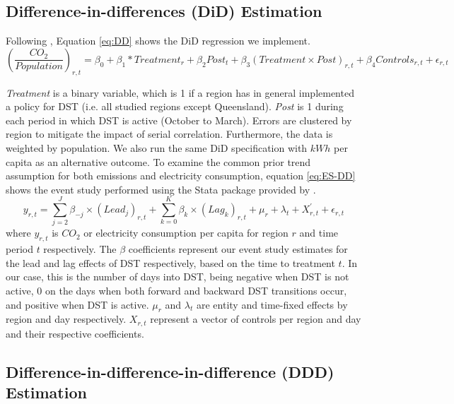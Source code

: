 \subsection{Difference-in-differences (DiD) Estimation}
Following \textcites{callaway_difference--differences_2021, goodman-bacon_difference--differences_2021}, Equation \ref{eq:DD} shows the \ac{DiD} regression we implement.
\begin{equation}
    \left(\frac{CO_2}{Population}\right)_{r,t}
 = \beta_0 + \beta_1*Treatment_{r} + \beta_2Post_{t} + \beta_3(Treatment \times Post)_{r,t} + \beta_4 Controls_{r,t}
     + \epsilon_{r,t}
     \label{eq:DD}
\end{equation}

\textit{Treatment} is a binary variable, which is 1 if a region has in general implemented a policy for \ac{DST} (i.e. all studied regions except Queensland). \textit{Post} is 1 during each period in which \ac{DST} is active (October to March). Errors are clustered by region to mitigate the impact of serial correlation. Furthermore, the data is weighted by population. We also run the same \ac{DiD} specification with $kWh$ per capita as an alternative outcome.
To examine the common prior trend assumption for both emissions and electricity consumption, equation \ref{eq:ES-DD} shows the event study performed using the Stata package provided by \textcite{clarke_implementing_2021}.
\begin{equation}
    y_{r,t} = \sum_{j=2}^{J} \beta_{-j} \times (Lead_j)_{r,t} + \sum_{k=0}^K \beta_{k} \times (Lag_k)_{r,t} + \mu_r + \lambda_t + X^{'}_{r,t} + \epsilon_{r,t}
    \label{eq:ES-DD}
\end{equation}
where $y_{r,t}$ is $CO_2$ or electricity consumption per capita for region $r$ and time period $t$ respectively. The $\beta$ coefficients represent our event study estimates for the lead and lag effects of DST respectively, based on the time to treatment $t$. In our case, this is the number of days into DST, being negative when DST is not active, 0 on the days when both forward and backward DST transitions occur, and positive when DST is active. $\mu_r$ and $\lambda_t$ are entity and time-fixed effects by region and day respectively. $X_{r,t}$ represent a vector of controls per region and day and their respective coefficients.  

\subsection{Difference-in-difference-in-difference (DDD) Estimation}

